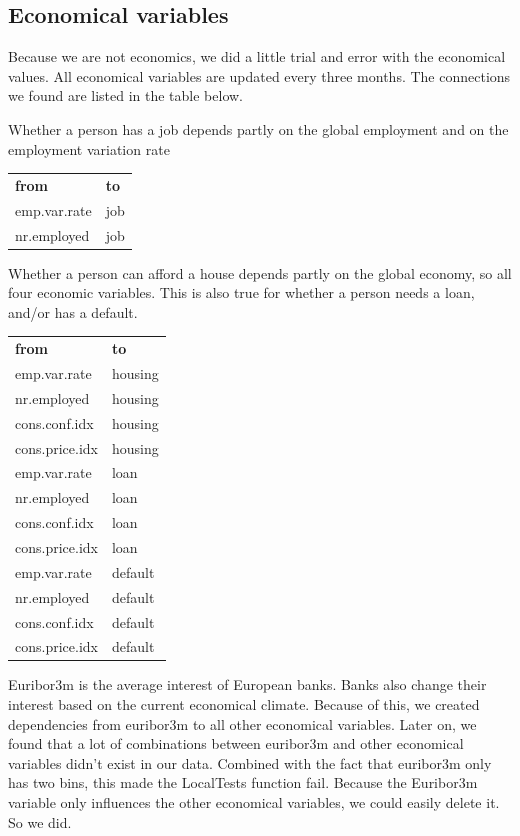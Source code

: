 \documentclass[11pt]{article}
\begin{document}
\begin{multicols}{2}
\subsection{Economical variables}
Because we are not economics, we did a little trial and error with the
economical values. All economical variables are updated every three months. The
connections we found are listed in the table below. 

\bigskip
Whether a person has a job depends partly on the global employment and on the
employment variation rate

\medskip
\begin{tabular}{ll}
    \textbf{from} & \textbf{to} \\
    emp.var.rate & job\\
    nr.employed & job 
\end{tabular}

\bigskip
Whether a person can afford a house depends partly on the global economy, so all
four economic variables. This is also true for whether a person needs a loan,
and/or has a default. 

\medskip
\begin{tabular}{ll}
    \textbf{from} & \textbf{to} \\
    emp.var.rate & housing \\
    nr.employed & housing \\ 
    cons.conf.idx & housing \\ 
    cons.price.idx & housing \\ 
    emp.var.rate & loan \\
    nr.employed & loan \\ 
    cons.conf.idx & loan \\ 
    cons.price.idx & loan \\ 
    emp.var.rate & default \\
    nr.employed & default \\ 
    cons.conf.idx & default \\ 
    cons.price.idx & default \\ 
\end{tabular}

\bigskip
Euribor3m is the average interest of European banks. Banks also change their
interest based on the current economical climate. Because of this, we created
dependencies from euribor3m to all other economical variables. Later on, we
found that a lot of combinations between euribor3m and other economical
variables didn't exist in our data. Combined with the fact that euribor3m only
has two bins, this made the LocalTests function fail. Because the Euribor3m
variable only influences the other economical variables, we could easily delete
it. So we did. 




\end{multicols}
\end{document}
